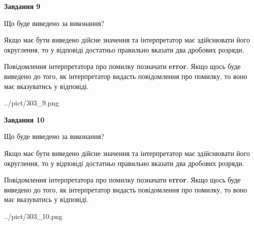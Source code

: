 \documentclass[12pt, ukrainian]{article}
\begin{document}
{\begin {Large}
{\begin {center}\textbf{Завдання 9}\end {center}}\par
Що буде виведено за виконання? \par

Якщо має бути виведено дійсне значення та інтерпретатор має здійснювати його округлення, 
то у відповіді достатньо правильно вказати два дробових розряди.

Повідомлення інтерпретатора про помилку позначати \textbf{error}.
Якщо щось буде виведено до того, як інтерпретатор видасть повідомлення про помилку, 
то воно має вказуватись у відповіді. \par

\begin{center}
	{../pict/303_9.png}
\end{center}
\newpage

{\begin {center}\textbf{Завдання 10}\end {center}}\par
Що буде виведено за виконання? \par

Якщо має бути виведено дійсне значення та інтерпретатор має здійснювати його округлення, 
то у відповіді достатньо правильно вказати два дробових розряди.

Повідомлення інтерпретатора про помилку позначати \textbf{error}.
Якщо щось буде виведено до того, як інтерпретатор видасть повідомлення про помилку, 
то воно має вказуватись у відповіді. \par

\begin{center}
	{../pict/303_10.png}
\end{center}
\newpage

\end {Large}}
\end{document}
